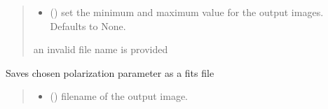 \documentclass[letterpaper,10pt,english]{sphinxmanual}
\begin{document}
\begin{fulllineitems}
\begin{fulllineitems}
\begin{quote}
\begin{description}
\begin{itemize}
\item {} 
\sphinxAtStartPar
{} (\sphinxstyleliteralemphasis{\sphinxupquote{{[}}}\sphinxstyleliteralemphasis{\sphinxupquote{, }}\sphinxstyleliteralemphasis{\sphinxupquote{{]}}}\sphinxstyleliteralemphasis{\sphinxupquote{, }}) \textendash{} set the minimum and maximum value for the output images. Defaults to None.

\end{itemize}

\sphinxAtStartPar
{} \textendash{} an invalid file name is provided

\end{description}\end{quote}

\end{fulllineitems}


\begin{fulllineitems}
\label{\detokenize{micropolarray:micropolarray.micropol_image.MicropolImage.save_param_as_fits}}
\pysigstartsignatures
{}
\pysigstopsignatures
\sphinxAtStartPar
Saves chosen polarization parameter as a fits file
\begin{quote}\begin{description}
\begin{itemize}
\item {} 
\sphinxAtStartPar
{} () \textendash{} filename of the output image.


\end{itemize}
\end{description}
\end{quote}
\end{fulllineitems}
\end{fulllineitems}
\end{document}
